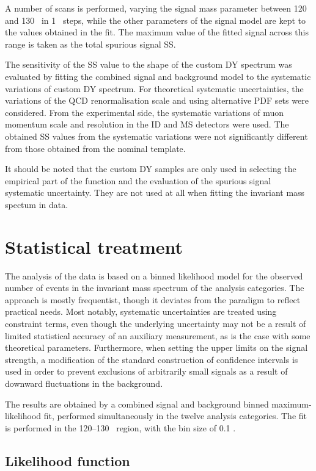 A number of scans is performed, varying the signal mass parameter
between 120 and 130 \GeV~in 1 \GeV~steps, while the other parameters
of the signal model are kept to the values obtained in the fit.
The maximum value of the fitted signal across this range is taken
as the total spurious signal SS.

The sensitivity of the SS value to the shape of the custom DY
spectrum was evaluated by fitting the combined signal and
background model to the systematic variations of custom DY
spectrum. For theoretical systematic uncertainties, the variations
of the QCD renormalisation scale and using alternative PDF sets
were considered. From the experimental side, the systematic
variations of muon momentum scale and resolution in the ID and
MS detectors were used. The obtained SS values from the
systematic variations were not significantly different from
those obtained from the nominal template.

It should be noted that the custom DY samples are only used in
selecting the empirical part of the function and the evaluation
of the spurious signal systematic uncertainty. They are not used
at all when fitting the invariant mass spectum in data.

\section{Statistical treatment}

The analysis of the data is based on a binned likelihood model
for the observed number of events in the invariant mass spectrum
of the analysis categories. The approach is mostly frequentist,
though it deviates from the paradigm to reflect practical needs.
Most notably, systematic uncertainties are treated using
constraint terms, even though the underlying uncertainty may not
be a result of limited statistical accuracy of an auxiliary
measurement, as is the case with some theoretical parameters.
Furthermore, when setting the upper limits on the signal
strength, a modification of the standard construction of
confidence intervals is used in order to prevent exclusions of
arbitrarily small signals as a result of downward fluctuations
in the background.

The results are obtained by a combined signal and background
binned maximum-likelihood fit, performed simultaneously in the
twelve analysis categories. The fit is performed in the 120--130
\GeV~region, with the bin size of 0.1 \GeV.

\subsection{Likelihood function}

